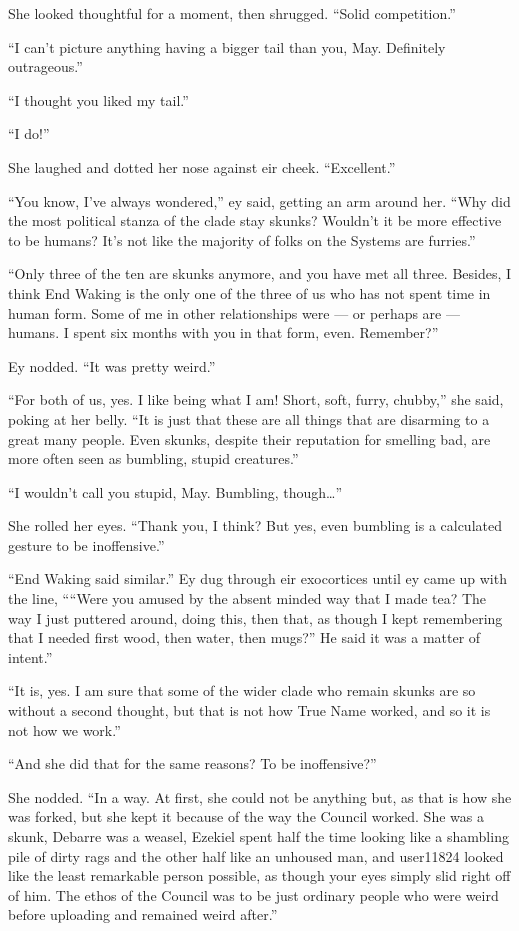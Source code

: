 She looked thoughtful for a moment, then shrugged. ``Solid competition.''

``I can't picture anything having a bigger tail than you, May. Definitely outrageous.''

``I thought you liked my tail.''

``I do!''

She laughed and dotted her nose against eir cheek. ``Excellent.''

``You know, I've always wondered,'' ey said, getting an arm around her. ``Why did the most political stanza of the clade stay skunks? Wouldn't it be more effective to be humans? It's not like the majority of folks on the Systems are furries.''

``Only three of the ten are skunks anymore, and you have met all three. Besides, I think End Waking is the only one of the three of us who has not spent time in human form. Some of me in other relationships were — or perhaps are — humans. I spent six months with you in that form, even. Remember?''

Ey nodded. ``It was pretty weird.''

``For both of us, yes. I like being what I am! Short, soft, furry, chubby,'' she said, poking at her belly. ``It is just that these are all things that are disarming to a great many people. Even skunks, despite their reputation for smelling bad, are more often seen as bumbling, stupid creatures.''

``I wouldn't call you stupid, May. Bumbling, though\ldots{}''

She rolled her eyes. ``Thank you, I think? But yes, even bumbling is a calculated gesture to be inoffensive.''

``End Waking said similar.'' Ey dug through eir exocortices until ey came up with the line, ````Were you amused by the absent minded way that I made tea? The way I just puttered around, doing this, then that, as though I kept remembering that I needed first wood, then water, then mugs?'' He said it was a matter of intent.''

``It is, yes. I am sure that some of the wider clade who remain skunks are so without a second thought, but that is not how True Name worked, and so it is not how we work.''

``And she did that for the same reasons? To be inoffensive?''

She nodded. ``In a way. At first, she could not be anything but, as that is how she was forked, but she kept it because of the way the Council worked. She was a skunk, Debarre was a weasel, Ezekiel spent half the time looking like a shambling pile of dirty rags and the other half like an unhoused man, and user11824 looked like the least remarkable person possible, as though your eyes simply slid right off of him. The ethos of the Council was to be just ordinary people who were weird before uploading and remained weird after.''

